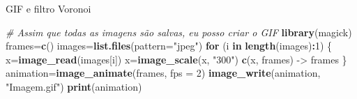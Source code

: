 \documentclass[
  ignorenonframetext,
]{beamer}
\newenvironment{Shaded}{\begin{snugshade}}{\end{snugshade}}
\newcommand{\CommentTok}[1]{\textcolor[rgb]{0.56,0.35,0.01}{\textit{#1}}}
\newcommand{\ControlFlowTok}[1]{\textcolor[rgb]{0.13,0.29,0.53}{\textbf{#1}}}
\newcommand{\DataTypeTok}[1]{\textcolor[rgb]{0.13,0.29,0.53}{#1}}
\newcommand{\DecValTok}[1]{\textcolor[rgb]{0.00,0.00,0.81}{#1}}
\newcommand{\KeywordTok}[1]{\textcolor[rgb]{0.13,0.29,0.53}{\textbf{#1}}}
\newcommand{\NormalTok}[1]{#1}
\newcommand{\OperatorTok}[1]{\textcolor[rgb]{0.81,0.36,0.00}{\textbf{#1}}}
\newcommand{\StringTok}[1]{\textcolor[rgb]{0.31,0.60,0.02}{#1}}
\begin{document}
\begin{frame}[fragile]{GIF e filtro Voronoi}
\protect\hypertarget{gif-e-filtro-voronoi-7}{}

\small

\begin{Shaded}
\begin{Highlighting}[]
\CommentTok{# Assim que todas as imagens são salvas, eu posso criar o GIF}
\KeywordTok{library}\NormalTok{(magick)}
\NormalTok{frames=}\KeywordTok{c}\NormalTok{()}
\NormalTok{images=}\KeywordTok{list.files}\NormalTok{(}\DataTypeTok{pattern=}\StringTok{"jpeg"}\NormalTok{)}
\ControlFlowTok{for}\NormalTok{ (i }\ControlFlowTok{in} \KeywordTok{length}\NormalTok{(images)}\OperatorTok{:}\DecValTok{1}\NormalTok{)}
\NormalTok{\{}
\NormalTok{  x=}\KeywordTok{image_read}\NormalTok{(images[i])}
\NormalTok{  x=}\KeywordTok{image_scale}\NormalTok{(x, }\StringTok{"300"}\NormalTok{)}
  \KeywordTok{c}\NormalTok{(x, frames) ->}\StringTok{ }\NormalTok{frames}
\NormalTok{\}}
\NormalTok{animation=}\KeywordTok{image_animate}\NormalTok{(frames, }\DataTypeTok{fps =} \DecValTok{2}\NormalTok{)}
\KeywordTok{image_write}\NormalTok{(animation, }\StringTok{"Imagem.gif"}\NormalTok{)}
\KeywordTok{print}\NormalTok{(animation)}
\end{Highlighting}
\end{Shaded}

\end{frame}
\end{document}
